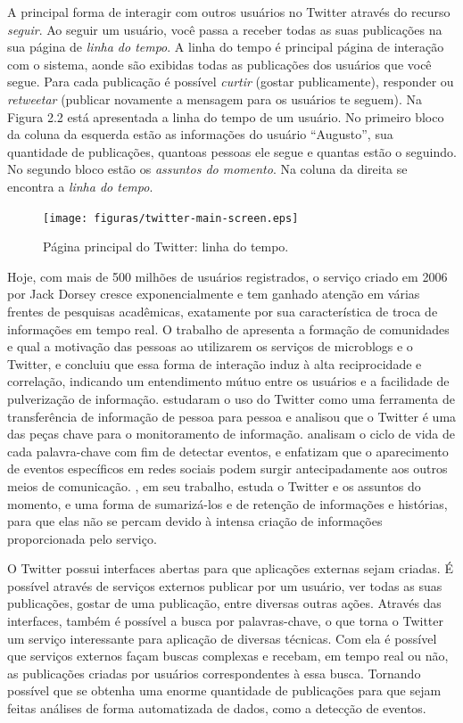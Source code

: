A principal forma de interagir com outros usuários no Twitter através do recurso \textit{seguir}. Ao seguir um usuário, você passa a receber todas as suas publicações na sua página de \textit{linha do tempo}. A linha do tempo é principal página de interação com o sistema, aonde são exibidas todas as publicações dos usuários que você segue. Para cada publicação é possível \textit{curtir} (gostar publicamente), responder ou \textit{retweetar} (publicar novamente a mensagem para os usuários te seguem). Na Figura 2.2 está apresentada a linha do tempo de um usuário. No primeiro bloco da coluna da esquerda estão as informações do usuário ``Augusto'', sua quantidade de publicações, quantoas pessoas ele segue e quantas estão o seguindo. No segundo bloco estão os \textit{assuntos do momento}. Na coluna da direita se encontra a \textit{linha do tempo}.

\begin{figure}[htpb]
	\begin{center}	
		\texttt{[image: figuras/twitter-main-screen.eps]}
		\caption{Página principal do Twitter: linha do tempo.}
	\end{center}
\end{figure}

Hoje, com mais de 500 milhões de usuários registrados, o serviço criado em 2006 por Jack Dorsey cresce exponencialmente e tem ganhado atenção em várias frentes de pesquisas acadêmicas, exatamente por sua característica de troca de informações em tempo real. O trabalho de  apresenta a formação de comunidades e qual a motivação das pessoas ao utilizarem os serviços de microblogs e o Twitter, e concluiu que essa forma de interação induz à alta reciprocidade e correlação, indicando um entendimento mútuo entre os usuários e a facilidade de pulverização de informação.  estudaram o uso do Twitter como uma ferramenta de transferência de informação de pessoa para pessoa e analisou que o Twitter é uma das peças chave para o monitoramento de informação.  analisam o ciclo de vida de cada palavra-chave com fim de detectar eventos, e enfatizam que o aparecimento de eventos específicos em redes sociais podem surgir antecipadamente aos outros meios de comunicação. , em seu trabalho, estuda o Twitter e os assuntos do momento, e uma forma de sumarizá-los e de retenção de informações e histórias, para que elas não se percam devido à intensa criação de informações proporcionada pelo serviço. 

O Twitter possui interfaces abertas para que aplicações externas sejam criadas. É possível através de serviços externos publicar por um usuário, ver todas as suas publicações, gostar de uma publicação, entre diversas outras ações. Através das interfaces, também é possível a busca por palavras-chave, o que torna o Twitter um serviço interessante para aplicação de diversas técnicas. Com ela é possível que serviços externos façam buscas complexas e recebam, em tempo real ou não, as publicações criadas por usuários correspondentes à essa busca. Tornando possível que se obtenha uma enorme quantidade de publicações para que sejam feitas análises de forma automatizada de dados, como a detecção de eventos.

